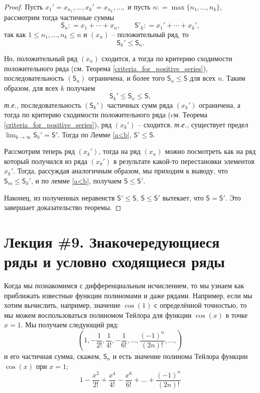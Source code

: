 \begin{proof}
 Пусть $x_1' = x_{n_1}, \ldots, x_k' = x_{n_k}, \ldots,$ и пусть $n: = \max \{n_1,\ldots, n_k\}$, рассмотрим тогда частичные суммы
  \[
  \mathsf{S}_n: = x_1 + \cdots + x_n, \qquad \mathsf{S}'_k: = x_1' + \cdots + x_k',
 \]
так как $1\le n_1, \ldots, n_k \le n$ и $(x_n)$ -- положительный ряд, то
\[
 \mathsf{S}_k' \le \mathsf{S}_n.
\]

Но, положительный ряд $(x_n)$ сходится, а тогда по критерию сходимости положительного ряда (см. Теорема \ref{criteria_for_positive_series}), последовательность $(\mathsf{S}_n)$ ограничена, и более того $\mathsf{S}_n \le \mathsf{S}$ для всех $n$. Таким образом, для всех $k$ получаем
\[
 \mathsf{S}_k' \le \mathsf{S}_n \le \mathsf{S},
\]
\textit{т.е.,} последовательность $(\mathsf{S}_k')$ частичных сумм ряда $(x_k')$ ограничена, а тогда по критерию сходимости положительного ряда (cм. Теорема \ref{criteria_for_positive_series}), ряд $(x_k')$ -- сходится, \textit{т.е.,} существует предел $\lim_{k \to \infty} \mathsf{S}_k' = \mathsf{S}'$. Тогда по Лемме \ref{a<b}, $\mathsf{S}' \le \mathsf{S}.$

Рассмотрим теперь ряд $(x_k')$, тогда на ряд $(x_n)$ можно посмотреть как на ряд который получился из ряда $(x_k')$ в результате какой-то перестановки элементов $x_k'$. Тогда, рассуждая аналогичным образом, мы приходим к выводу, что 
$\mathsf{S}_m \le \mathsf{S}_k'$, и по лемме \ref{a<b}, получаем $\mathsf{S} \le \mathsf{S}'$.

Наконец, из полученных неравенств $\mathsf{S}' \le \mathsf{S}$, $\mathsf{S} \le \mathsf{S}'$ вытекает, что $\mathsf{S} = \mathsf{S}'$. Это завершает доказательство теоремы.
\end{proof}

\section{Лекция \#9. Знакочередующиеся ряды и условно сходящиеся ряды}

Когда мы познакомимся с дифференциальным исчислением, то мы узнаем как приближать известные функции полиномами и даже рядами. Например, если мы хотим вычислить, например, значение $\cos(1)$ с определённой точностью, то мы можем воспользоваться полиномом Тейлора для функции $\cos(x)$ в точке $x=1$. Мы получаем следующий ряд:
\[
 \left(1, - \frac{1}{2!}, \frac{1}{4!}, - \frac{1}{6!}, \ldots, \frac{(-1)^n}{(2n)!}, \ldots, \right) 
\]
и его частичная сумма, скажем, $\mathsf{S}_n$ и есть значение полинома Тейлора функции $\cos(x)$ при $x=1$;
\[
 1 - \frac{x^2}{2!} + \frac{x^4}{4!} - \frac{x^6}{6!} + \ldots + \frac{(-1)^n}{(2n)!} 
\]

